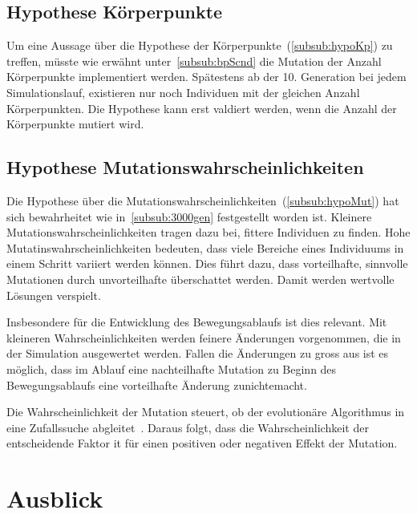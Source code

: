     \subsection{Hypothese Körperpunkte}

      Um eine Aussage über die Hypothese der Körperpunkte~(\vref{subsub:hypoKp}) zu treffen,
      müsste wie erwähnt unter~\vref{subsub:bpScnd} die Mutation der Anzahl Körperpunkte implementiert werden.
      Spätestens ab der 10. Generation bei jedem Simulationslauf,
      existieren nur noch Individuen mit der gleichen Anzahl Körperpunkten.
      Die Hypothese kann erst valdiert werden, wenn die Anzahl der Körperpunkte mutiert wird.

    \subsection{Hypothese Mutationswahrscheinlichkeiten}

      Die Hypothese über die Mutationswahrscheinlichkeiten~(\vref{subsub:hypoMut}) hat sich bewahrheitet
      wie in~\vref{subsub:3000gen} festgestellt worden ist.
      Kleinere Mutationswahrscheinlichkeiten tragen dazu bei, fittere Individuen zu finden.
      Hohe Mutatinswahrscheinlichkeiten bedeuten,
      dass viele Bereiche eines Individuums in einem Schritt variiert werden können.
      Dies führt dazu, dass vorteilhafte, sinnvolle Mutationen durch unvorteilhafte überschattet werden.
      Damit werden wertvolle Lösungen verspielt.

      \smallskip

      Insbesondere für die Entwicklung des Bewegungsablaufs ist dies relevant.
      Mit kleineren Wahrscheinlichkeiten werden feinere Änderungen vorgenommen,
      die in der Simulation ausgewertet werden.
      Fallen die Änderungen zu gross aus ist es möglich, dass im Ablauf eine nachteilhafte Mutation
      zu Beginn des Bewegungsablaufs eine vorteilhafte Änderung zunichtemacht.

      \smallskip

      Die Wahrscheinlichkeit der Mutation steuert,
      ob der evolutionäre Algorithmus in eine Zufallssuche abgleitet~\cite{Sampson1976}.
      Daraus folgt, dass die Wahrscheinlichkeit der entscheidende Faktor it für einen positiven oder
      negativen Effekt der Mutation.

  \section{Ausblick\label{sec:ausblick}}

